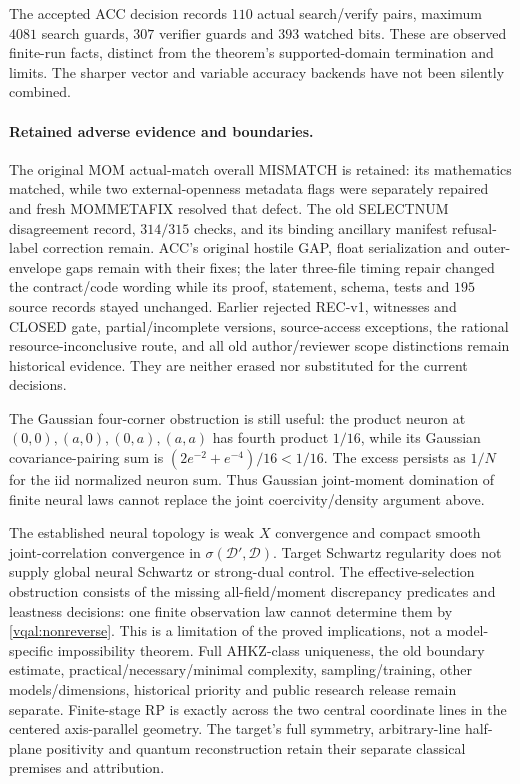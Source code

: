 \documentclass[11pt]{article}
\theoremstyle{plain}
\theoremstyle{definition}
\theoremstyle{remark}
\newcommand{\cD}{\mathcal{D}}
\begin{document}
The accepted ACC decision records $110$ actual search/verify pairs,
maximum $4081$ search guards, $307$ verifier guards and $393$ watched
bits. These are observed finite-run facts, distinct from the theorem's
supported-domain termination and limits. The sharper vector and variable
accuracy backends have not been silently combined.

\paragraph{Retained adverse evidence and boundaries.}
The original MOM actual-match overall MISMATCH is retained: its mathematics
matched, while two external-openness metadata flags were separately
repaired and fresh MOMMETAFIX resolved that defect. The old SELECTNUM
disagreement record, $314/315$ checks, and its binding ancillary manifest
refusal-label correction remain. ACC's original hostile GAP, float
serialization and outer-envelope gaps remain with their fixes; the later
three-file timing repair changed the contract/code wording while its
proof, statement, schema, tests and $195$ source records stayed unchanged.
Earlier rejected REC-v1, witnesses and CLOSED gate, partial/incomplete
versions, source-access exceptions, the rational resource-inconclusive
route, and all old author/reviewer scope distinctions remain historical
evidence. They are neither erased nor substituted for the current decisions.

The Gaussian four-corner obstruction is still useful: the product neuron
at $(0,0),(a,0),(0,a),(a,a)$ has fourth product $1/16$, while its
Gaussian covariance-pairing sum is $(2e^{-2}+e^{-4})/16<1/16$.
The excess persists as $1/N$ for the iid normalized neuron sum.
Thus Gaussian joint-moment domination of finite neural laws cannot
replace the joint coercivity/density argument above.

The established neural topology is weak $X$ convergence and compact
smooth joint-correlation convergence in $\sigma(\cD',\cD)$.
Target Schwartz regularity does not supply global neural Schwartz or
strong-dual control. The effective-selection obstruction consists of the
missing all-field/moment discrepancy predicates and leastness decisions:
one finite observation law cannot determine them by
\eqref{vqal:nonreverse}. This is a limitation of the proved implications,
not a model-specific impossibility theorem. Full AHKZ-class uniqueness,
the old boundary estimate, practical/necessary/minimal complexity,
sampling/training, other models/dimensions, historical priority and
public research release remain separate. Finite-stage RP is exactly
across the two central coordinate lines in the centered axis-parallel
geometry. The target's full symmetry, arbitrary-line half-plane
positivity and quantum reconstruction retain their separate classical
premises and attribution.
\end{document}
